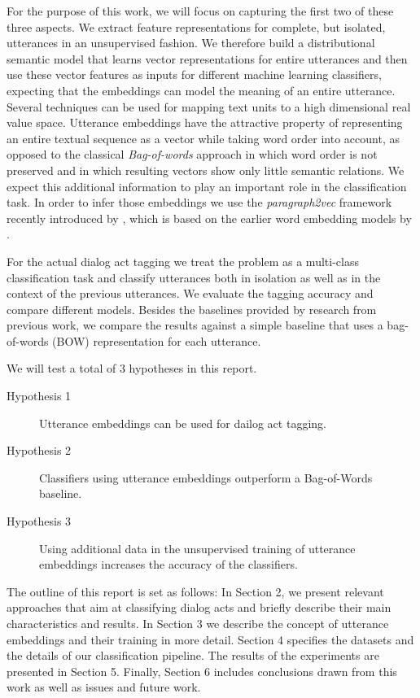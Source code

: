 For the purpose of this work, we will focus on capturing the first two of these three aspects. We extract feature representations for complete, but isolated, utterances in an unsupervised fashion.
We therefore build a distributional semantic model that learns vector representations for entire utterances and then use these vector features as inputs for different machine learning classifiers, expecting that the embeddings can model the meaning of an entire utterance.
Several techniques can be used for mapping text units to a high dimensional real value space.
Utterance embeddings have the attractive property of representing an entire textual sequence as a vector while taking word order into account, as opposed to the classical \emph{Bag-of-words} approach in which word order is not preserved and in which resulting vectors show only little semantic relations.
We expect this additional information to play an important role in the classification task. In order to infer those embeddings we use the \emph{paragraph2vec} framework recently introduced by , which is based on the earlier word embedding models by .

For the actual dialog act tagging we treat the problem as a multi-class classification task and classify utterances both in isolation as well as in the context of the previous utterances.
We evaluate the tagging accuracy and compare different models.
Besides the baselines provided by research from previous work, we compare the results against a simple baseline that uses a bag-of-words (BOW) representation for each utterance. 

We will test a total of 3 hypotheses in this report.
\begin{description}
	\item[Hypothesis 1] Utterance embeddings can be used for dailog act tagging.
	\item[Hypothesis 2] Classifiers using utterance embeddings outperform a Bag-of-Words baseline.
	\item[Hypothesis 3] Using additional data in the unsupervised training of utterance embeddings increases the accuracy of the classifiers.
\end{description}

The outline of this report is set as follows: In Section 2, we present relevant approaches that aim at classifying dialog acts and briefly describe their main characteristics and results. In Section 3 we describe the concept of utterance embeddings and their training in more detail. Section 4 specifies the datasets and the details of our classification pipeline. The results of the experiments are presented in Section 5. Finally, Section 6 includes conclusions drawn from this work as well as issues and future work. 
